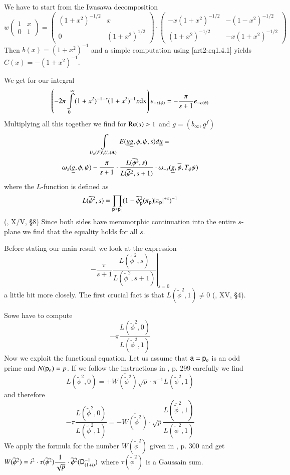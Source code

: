 We have to start from the Iwasawa decomposition
{\fontsize{10}{12}\selectfont
$$
w
\left(
\begin{matrix}
1 & x\\
0 & 1
\end{matrix}
\right)
=
\left(
\begin{matrix}
(1+x^{2})^{-1/2} & x\\
0 & (1+x^{2})^{1/2}
\end{matrix}
\right)
\cdot
\left(
\begin{matrix}
-x(1+x^{2})^{-1/2} &-(1-x^{2})^{-1/2}\\
(1+x^{2})^{-1/2} & -x(1+x^{2})^{-1/2}
\end{matrix}
\right)
$$}\relax
Then $b(x)=(1+x^{2})^{-1}$ and a simple computation using \eqref{art2-eq1.4.1} yields $C(x)=-(1+x^{2})^{-1}$.

We get for our integral
$$
\left(-2\pi \int\limits^{\infty}_{0}(1+x^{2})^{-1-s}(1+x^{2})^{-1}x\mathrm{dx}\right)e_{-\epsilon(\phi)}=-\frac{\pi}{s+1}e_{-\epsilon(\phi)}
$$
Multiplying all this together we find for $\mathrm{Re}(s)>1$ and $g=(b_{\infty},\underline{g}^{f})$
\begin{gather*}
\int\limits_{U_{o}(F)\backslash U_{o}(\mathbf{A})}E(\underline{u}\underline{g},\phi,\psi,s)d\underline{u}=\\
\omega_{s}(\underline{g},\phi,\psi)-\frac{\pi}{s+1}\cdot \frac{L(\widetilde{\phi}^{2},s)}{L(\widetilde{\phi}^{2},s+1)}\cdot \omega_{-s}(\underline{g},\overline{\phi},T_{\phi}\psi)
\end{gather*}
where the $L$-function is defined as
$$
L(\widetilde{\phi}^{2},s)=\prod\limits_{\mathsf{p}\neq \mathsf{p}_{o}}(1-\widetilde{\phi}^{2}_{\mathsf{p}}(\pi_{\mathsf{p}})|\pi_{\mathsf{p}}|^{+s})^{-1}
$$
(\cite{art2-key12}, X/V, \S8) Since both sides have meromorphic continuation into the entire $s$-plane we find that the equality holds for all $s$.

Before stating our main result we look at the expression
$$
\left.-\frac{\pi}{s+1}\frac{L(\widetilde{\phi}^{2},s)}{L(\widetilde{\phi}^{2},s+1)}\right|_{s=0}
$$
a little bit more closely. The first crucial fact is that $L(\widetilde{\phi}^{2},1)\neq 0$ (\cite{art2-key12}, XV, \S4).

So\pageoriginale we have to compute
$$
-\pi\frac{L(\widetilde{\phi}^{2},0)}{L(\widetilde{\phi}^{2},1)}
$$
Now we exploit the functional equation. Let us assume that $\mathsf{a}=\mathsf{p}_{o}$ is an odd prime and $N(\mathsf{p}_{o})=p$. If we follow the instructions in \cite{art2-key12}, p. 299 carefully we find
$$
L(\widetilde{\phi}^{2},0)=+\overline{W(\widetilde{\phi}^{2})}\sqrt{p}\cdot \pi^{-1}L(\widetilde{\phi}^{2},1)
$$
and therefore
$$
-\pi \frac{L(\widetilde{\phi}^{2},0)}{L(\widetilde{\phi}^{2},1)}=-\overline{W(\widetilde{\phi}^{2})}\cdot \sqrt{p}\frac{L(\overline{\widetilde{\phi}}^{2},1)}{L(\widetilde{\phi}^{2},1)}
$$
We apply the formula for the number $W(\widetilde{\phi}^{2})$ given in \cite{art2-key12}, p. 300 and get $W(\widetilde{\phi}^{2})=i^{2}\cdot \tau(\widetilde{\phi}^{2})\dfrac{1}{\sqrt{p}}\cdot \widetilde{\phi}^{2}(\mathsf{D}^{-1}_{(1+i)})$ where $\tau(\widetilde{\phi}^{2})$ is a Gaussain sum.

